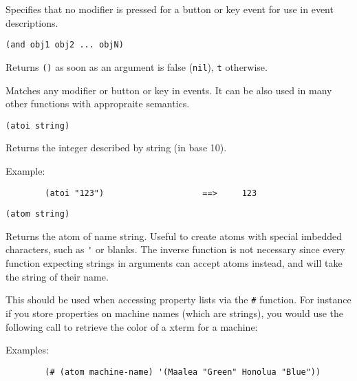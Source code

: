         

Specifies that no modifier is pressed for a button or key event for use in
event descriptions.

        
{\usagefont\begin{verbatim}
(and obj1 obj2 ... objN)
\end{verbatim}}\usageupspace

Returns \verb"()" as soon as an argument is false (\verb"nil"),
\verb"t" otherwise.

        

Matches any modifier or button or key in events. It can be also used in many
other functions with appropraite semantics.

        
{\usagefont\begin{verbatim}
(atoi string)
\end{verbatim}}\usageupspace

Returns the integer described by string (in base 10).

{Example:\exemplefont\upspace\begin{verbatim}
        (atoi "123")                    ==>     123
\end{verbatim}}

        
{\usagefont\begin{verbatim}
(atom string)
\end{verbatim}}\usageupspace

Returns the atom of name string. Useful to create atoms with special
imbedded characters, such as \verb"'" or blanks. The inverse function is not
necessary since every {\WOOL} function expecting strings in arguments can
accept atoms instead, and will take the string of their name.  

This should be used when accessing property lists via the \verb|#| function.
For instance if you store properties on machine names (which are strings),
you would use the following call to retrieve the color of a xterm for a
machine:

{Examples:\exemplefont\upspace\begin{verbatim}
        (# (atom machine-name) '(Maalea "Green" Honolua "Blue"))
\end{verbatim}}

